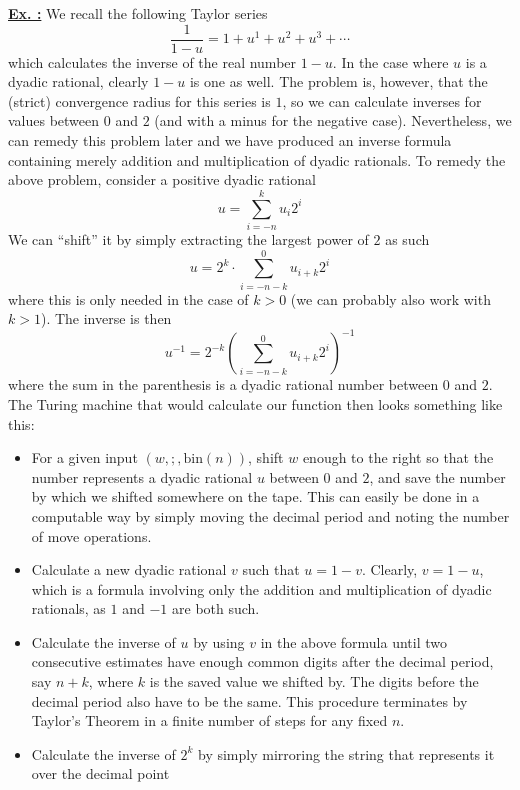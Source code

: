 \documentclass[a4paper, 12pt]{article}
\newcounter{excounter}[section]
\newenvironment{Exercise}
    {\refstepcounter{excounter}\underline{\textbf{Ex. \theexcounter:}}}
    {\par\vspace{\baselineskip}}
\begin{document}
\begin{Exercise}
    We recall the following Taylor series
    \[
        \frac{1}{1-u} = 1 + u^1 + u^2 + u^3 + \cdots
    \]
    which calculates the inverse of the real number $1 - u$.
    In the case where $u$ is a dyadic rational, clearly $1 - u$ is one as well.
    The problem is, however, that the (strict) convergence radius for this series is $1$,
    so we can calculate inverses for values between $0$ and $2$ (and with a minus for the negative case).
    Nevertheless, we can remedy this problem later and we have produced an inverse
    formula containing merely addition and multiplication of dyadic rationals.
    To remedy the above problem, consider a positive dyadic rational
    \[
        u = \sum_{i = -n}^k u_i 2^i
    \]
    We can ``shift'' it by simply extracting the largest power of $2$ as such
    \[
        u = 2^k \cdot \sum_{i = -n-k}^0 u_{i+k}2^i
    \]
    where this is only needed in the case of $k > 0$
    (we can probably also work with $k > 1$).
    The inverse is then
    \[
        u^{-1} = 2^{-k} \left( \sum_{i = -n-k}^0 u_{i+k}2^i \right)^{-1}
    \]
    where the sum in the parenthesis is a dyadic rational number between $0$ and $2$.
    The Turing machine that would calculate our function then looks something like this:
    \begin{itemize}
        \item
            For a given input $(w,;,\text{bin}(n))$, shift $w$ enough to the right so that the number represents a dyadic rational $u$ between $0$ and $2$,
            and save the number by which we shifted somewhere on the tape.
            This can easily be done in a computable way by simply moving the decimal period and noting the number of move operations.
        \item
            Calculate a new dyadic rational $v$ such that $u = 1 - v$.
            Clearly, $v = 1 - u$,
            which is a formula involving only the addition and multiplication of dyadic rationals,
            as $1$ and $-1$ are both such.
        \item
            Calculate the inverse of $u$ by using $v$ in the above formula
            until two consecutive estimates have enough common digits after the decimal period,
            say $n+ k$, where $k$ is the saved value we shifted by.
            The digits before the decimal period also have to be the same.
            This procedure terminates by Taylor's Theorem in a finite number of steps for any fixed $n$.
        \item
            Calculate the inverse of $2^{k}$ by simply mirroring the string that represents it over the decimal point

\end{itemize}
\end{Exercise}
\end{document}

